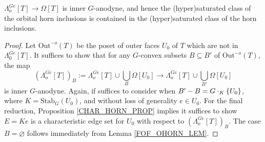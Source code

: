 \documentclass[a4paper,10pt,draft]{article}%
\begin{document}
{\begin{proposition}
      \label{ORB_HORN_PROP_B}
      $\Lambda_o^{Ge}[T] \to \Omega[T]$ is inner $G$-anodyne, and hence
      the (hyper)saturated class of the orbital horn inclusions is contained in
      the (hyper)saturated class of the horn inclusions.
\end{proposition}
\begin{proof}
      Let $\mathrm{Out}^{-o}(T)$ be the poset of outer faces $U_0$ of $T$ which are not in $\Lambda_0^{Ge}[T]$.
      It suffices to show that for any $G$-convex subsets $B \subseteq B'$ of $\mathrm{Out}^{-o}(T)$, the map
      \begin{equation}
            \label{ORB_HORN_EQ}
            \left(\Lambda^{G e}_{o}[T]\right)_B
            := \Lambda_o^{Ge}[T] \cup \mathop{\bigcup}\limits_{B}\Omega[U_0]
            \to
            \Lambda_o^{Ge}[T] \cup \mathop{\bigcup}\limits_{B'}\Omega[U_0]
      \end{equation}
      is inner $G$-anodyne.
      Again, if suffices to consider when $B' - B = G \cdot_K \left\{U_0\right\}$, where $K = \mathrm{Stab}_G(U_0)$, and
      without loss of generality $e \in U_0$.
      For the final reduction, Proposition \ref{CHAR_HORN_PROP} implies it suffices to show
      $E = K e$ is a characteristic edge set for
      $U_0$ with respect to $(\Lambda^{G e}_o[T])_B$.
      The case $B = \varnothing$ follows immediately from Lemma \ref{FOF_OHORN_LEM}.    
      

\end{proof}}
\end{document}
